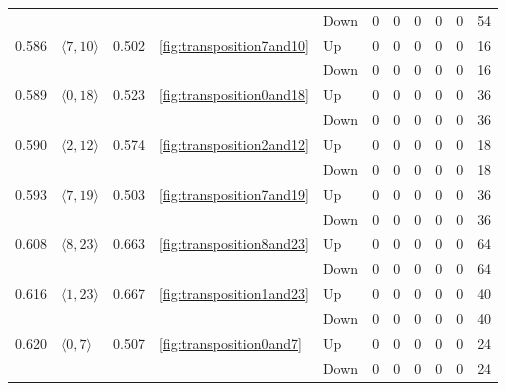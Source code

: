 \documentclass{article}
\begin{document}
\begin{center}
\begin{tabular}{lllllrrrrrr}
 &  &  &  & Down & 0 & 0 & 0 & 0 & 0 & 54 \\
\cline{1-11} \cline{2-11} \cline{3-11} \cline{4-11}
\multirow[t]{2}{*}{0.586} & \multirow[t]{2}{*}{$\langle7, 10\rangle$} & \multirow[t]{2}{*}{0.502} & \multirow[t]{2}{*}{\ref{fig:transposition7and10}} & Up & 0 & 0 & 0 & 0 & 0 & 16 \\
 &  &  &  & Down & 0 & 0 & 0 & 0 & 0 & 16 \\
\cline{1-11} \cline{2-11} \cline{3-11} \cline{4-11}
\multirow[t]{2}{*}{0.589} & \multirow[t]{2}{*}{$\langle0, 18\rangle$} & \multirow[t]{2}{*}{0.523} & \multirow[t]{2}{*}{\ref{fig:transposition0and18}} & Up & 0 & 0 & 0 & 0 & 0 & 36 \\
 &  &  &  & Down & 0 & 0 & 0 & 0 & 0 & 36 \\
\cline{1-11} \cline{2-11} \cline{3-11} \cline{4-11}
\multirow[t]{2}{*}{0.590} & \multirow[t]{2}{*}{$\langle2, 12\rangle$} & \multirow[t]{2}{*}{0.574} & \multirow[t]{2}{*}{\ref{fig:transposition2and12}} & Up & 0 & 0 & 0 & 0 & 0 & 18 \\
 &  &  &  & Down & 0 & 0 & 0 & 0 & 0 & 18 \\
\cline{1-11} \cline{2-11} \cline{3-11} \cline{4-11}
\multirow[t]{2}{*}{0.593} & \multirow[t]{2}{*}{$\langle7, 19\rangle$} & \multirow[t]{2}{*}{0.503} & \multirow[t]{2}{*}{\ref{fig:transposition7and19}} & Up & 0 & 0 & 0 & 0 & 0 & 36 \\
 &  &  &  & Down & 0 & 0 & 0 & 0 & 0 & 36 \\
\cline{1-11} \cline{2-11} \cline{3-11} \cline{4-11}
\multirow[t]{2}{*}{0.608} & \multirow[t]{2}{*}{$\langle8, 23\rangle$} & \multirow[t]{2}{*}{0.663} & \multirow[t]{2}{*}{\ref{fig:transposition8and23}} & Up & 0 & 0 & 0 & 0 & 0 & 64 \\
 &  &  &  & Down & 0 & 0 & 0 & 0 & 0 & 64 \\
\cline{1-11} \cline{2-11} \cline{3-11} \cline{4-11}
\multirow[t]{2}{*}{0.616} & \multirow[t]{2}{*}{$\langle1, 23\rangle$} & \multirow[t]{2}{*}{0.667} & \multirow[t]{2}{*}{\ref{fig:transposition1and23}} & Up & 0 & 0 & 0 & 0 & 0 & 40 \\
 &  &  &  & Down & 0 & 0 & 0 & 0 & 0 & 40 \\
\cline{1-11} \cline{2-11} \cline{3-11} \cline{4-11}
\multirow[t]{2}{*}{0.620} & \multirow[t]{2}{*}{$\langle0, 7\rangle$} & \multirow[t]{2}{*}{0.507} & \multirow[t]{2}{*}{\ref{fig:transposition0and7}} & Up & 0 & 0 & 0 & 0 & 0 & 24 \\
 &  &  &  & Down & 0 & 0 & 0 & 0 & 0 & 24 \\

\end{tabular}
\end{center}
\end{document}
